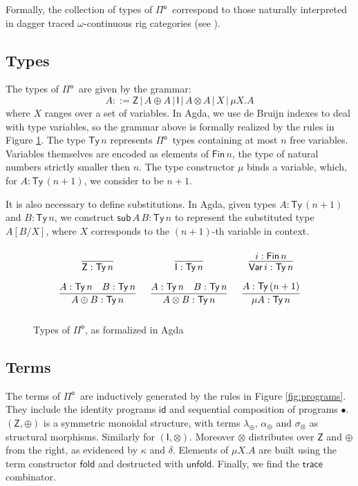 \documentclass[runningheads,a4paper]{llncs}
\newcommand{\Pio}{\ensuremath{\mathsf{\Pi}^{\mathsf{o}}}}
\newcommand{\Ty}{\mathsf{Ty}}
\newcommand{\Var}{\mathsf{Var}}
\newcommand{\id}{\mathsf{id}}
\newcommand{\fold}{\mathsf{fold}}
\newcommand{\unfold}{\mathsf{unfold}}
\newcommand{\sub}{\mathsf{sub}}
\newcommand{\trace}{\ensuremath{\mathsf{trace}}}
\newcommand{\Z}{\mathsf{Z}}
\newcommand{\I}{\mathsf{I}}
\begin{document}
Formally, the collection of types of \Pio\ correspond to those naturally
interpreted in dagger traced $\omega$-continuous rig categories (see
\cite{Karvonen19}).

\subsection{Types}

The types of \Pio\ are given by the grammar:
\[
A ::= \Z \, | \,A \oplus A \, | \,\I \,| \,A \otimes A \,| \,X \,|
\,\mu X.A 
\]
where $X$ ranges over a set of variables. In Agda, we use de Bruijn
indexes to deal with type variables, so the grammar above is formally
realized by the rules in Figure \ref{fig:types}. The type $\Ty\,n$
represents \Pio\ types containing at most $n$ free
variables. Variables themselves are encoded as elements of
$\mathsf{Fin}\,n$, the type of natural numbers strictly smaller then
$n$. The type constructor $\mu$ binds a variable, which, for $A : \Ty\,(n +
1)$, we consider to be $n + 1$.

It is also necessary to define substitutions. In Agda, given
types $A : \Ty\,(n+1)$ and $B : \Ty\,n$, we construct
$\sub\,A\,B : \Ty\,n$ to represent the substituted type $A[B/X]$,
where $X$ corresponds to the $(n+1)$-th variable in context.

\begin{figure}[h]
\[
\arraycolsep=8pt\def\arraystretch{2.8}
\begin{array}{ccc}
\infer{\Z : \Ty\,n}{} 
& \infer{\I : \Ty\,n}{}
& \infer{\Var\,i : \Ty\,n}{i : \mathsf{Fin}\,n}  \\
\infer{A \oplus B : \Ty\,n}{A : \Ty\,n & B : \Ty\,n}
& \infer{A \otimes B : \Ty\,n}{A : \Ty\,n & B : \Ty\,n}
& \infer{\mu A : \Ty\,n}{A : \Ty\,(n+1)} 
\end{array}
\]
\caption{Types of \Pio, as formalized in Agda}
\label{fig:types}
\end{figure}


\subsection{Terms}

The terms of \Pio\ are inductively generated by the rules in Figure
\ref{fig:programs}. They include the identity programs $\id$ and
sequential composition of programs $\bullet$. $(\Z,\oplus)$ is a
symmetric monoidal structure, with terms $\lambda_\oplus$,
$\alpha_\oplus$ and $\sigma_\otimes$ as structural
morphisms. Similarly for $(\I,\otimes)$. Moreover $\otimes$
distributes over $\Z$ and $\oplus$ from the right, as evidenced by  $\kappa$
and $\delta$. Elements of $\mu X.A$ are built using the term
constructor $\fold$ and destructed with $\unfold$. Finally, we find the
$\trace$ combinator. 
\end{document}
